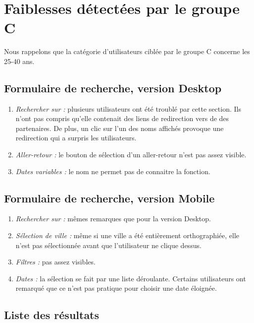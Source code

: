 
\section{Faiblesses d\'{e}tect\'{e}es par le groupe C}

Nous rappelons que la cat\'{e}gorie d'utilisateurs cibl\'{e}e par le groupe C
concerne les 25-40 ans.




\subsection{Formulaire de recherche, version Desktop}
\begin{enumerate}
\item {\em Rechercher sur : } plusieurs utilisateurs ont \'{e}t\'{e} troubl\'{e} par cette section. Ils n'ont pas compris qu'elle contenait des liens de redirection vers de des partenaires. De plus, un clic sur l'un des noms affich\'{e}s provoque une redirection qui a surpris les utilisateurs.
\item {\em Aller-retour : } le bouton de s\'{e}lection d'un aller-retour n'est pas assez visible.
\item {\em Dates variables : } le nom ne permet pas de connaitre la fonction.
\end{enumerate}

\subsection{Formulaire de recherche, version Mobile}

\begin{enumerate}
\item {\em Rechercher sur : } m\^{e}mes remarques que pour la version Desktop.
\item {\em S\'{e}lection de ville : } m\^{e}me si une ville a \'{e}t\'{e} enti\`{e}rement orthographi\'{e}e, elle n'est pas s\'{e}lectionn\'{e}e avant que l'utilisateur ne clique dessus.
\item {\em Filtres : } pas assez visibles.
\item {\em Dates : } la s\'{e}lection se fait par une liste d\'{e}roulante. Certains utilisateurs ont remarqu\'{e} que ce n'est pas pratique pour choisir une date \'{e}loign\'{e}e.
\end{enumerate}

\subsection{Liste des r\'{e}sultats}

